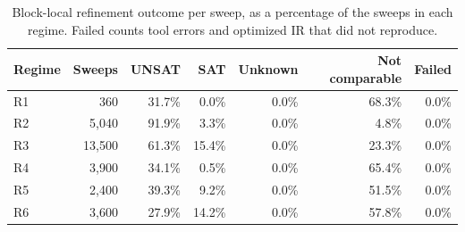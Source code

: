 \begin{table}[t]
\centering
\caption{Block-local refinement outcome per sweep, as a percentage of the sweeps in each regime. Failed counts tool errors and optimized IR that did not reproduce.}
\label{tab:smt}
\setlength{\tabcolsep}{3pt}
\begin{tabular}{|l|r|r|r|r|r|r|}
\hline
Regime & Sweeps & UNSAT & SAT & Unknown & Not comparable & Failed \\
\hline
R1 & 360 & 31.7\% & 0.0\% & 0.0\% & 68.3\% & 0.0\% \\
\hline
R2 & 5,040 & 91.9\% & 3.3\% & 0.0\% & 4.8\% & 0.0\% \\
\hline
R3 & 13,500 & 61.3\% & 15.4\% & 0.0\% & 23.3\% & 0.0\% \\
\hline
R4 & 3,900 & 34.1\% & 0.5\% & 0.0\% & 65.4\% & 0.0\% \\
\hline
R5 & 2,400 & 39.3\% & 9.2\% & 0.0\% & 51.5\% & 0.0\% \\
\hline
R6 & 3,600 & 27.9\% & 14.2\% & 0.0\% & 57.8\% & 0.0\% \\
\hline
\end{tabular}
\end{table}
